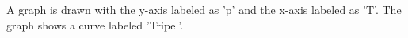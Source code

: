 A graph is drawn with the y-axis labeled as 'p' and the x-axis labeled as 'T'. The graph shows a curve labeled 'Tripel'.